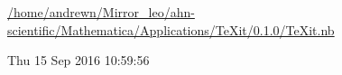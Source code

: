\documentclass[a4paper,11pt]{article}
\begin{document}
\noindent
{\small\url{/home/andrewn/Mirror_leo/ahn-scientific/Mathematica/Applications/TeXit/0.1.0/TeXit.nb}}

\medskip
\noindent
Thu 15 Sep 2016 10:59:56

\medskip
\end{document}
